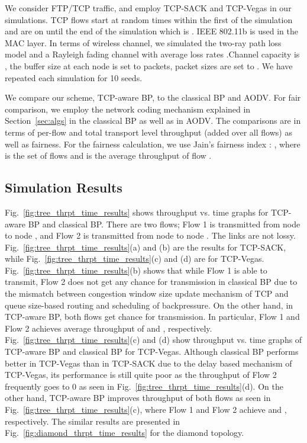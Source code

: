\documentclass[conference]{IEEEtran}
\begin{document}
We consider FTP/TCP traffic, and employ TCP-SACK and TCP-Vegas in our simulations. TCP flows start at random times within the first  of the simulation and are on until the end of the simulation which is . IEEE 802.11b is used in the MAC layer. In terms of wireless channel, we simulated the two-ray path loss model and a Rayleigh fading channel with average loss rates .Channel capacity is , the buffer size at each node is set to  packets, packet sizes are set to . We have repeated each  simulation for 10 seeds.

We compare our scheme, TCP-aware BP, to the classical BP and AODV. For fair comparison, we employ the network coding mechanism explained in Section~\ref{sec:algs} in the classical BP as well as in AODV. The comparisons are in terms of per-flow and total transport level throughput (added over all flows) as well as fairness. For the fairness calculation, we use Jain's fairness index \cite{fairness_index}: , where  is the set of flows and  is the average throughput of flow .





\subsection{Simulation Results}

Fig.~\ref{fig:tree_thrpt_time_results} shows throughput vs. time graphs for TCP-aware BP and classical BP. There are two flows; Flow 1 is transmitted from node  to node , and Flow 2 is transmitted from node  to node . The links are not lossy. Fig.~\ref{fig:tree_thrpt_time_results}(a) and (b) are the results for TCP-SACK, while Fig.~\ref{fig:tree_thrpt_time_results}(c) and (d) are for TCP-Vegas. Fig.~\ref{fig:tree_thrpt_time_results}(b) shows that while Flow 1 is able to transmit, Flow 2 does not get any chance for transmission in classical BP due to the mismatch between congestion window size update mechanism of TCP and queue size-based routing and scheduling of backpressure. On the other hand, in TCP-aware BP, both flows get chance for transmission. In particular, Flow 1 and Flow 2 achieves average throughput of  and , respectively. Fig.~\ref{fig:tree_thrpt_time_results}(c) and (d) show throughput vs. time graphs of TCP-aware BP and classical BP for TCP-Vegas. Although classical BP performs better in TCP-Vegas than in TCP-SACK due to the delay based mechanism of TCP-Vegas, its performance is still quite poor as the throughput of Flow 2 frequently goes to 0 as seen in Fig.~\ref{fig:tree_thrpt_time_results}(d). On the other hand, TCP-aware BP improves throughput of both flows as seen in Fig.~\ref{fig:tree_thrpt_time_results}(c), where Flow 1 and Flow 2 achieve  and , respectively. The similar results are presented in Fig.~\ref{fig:diamond_thrpt_time_results} for the diamond topology.
\end{document}
